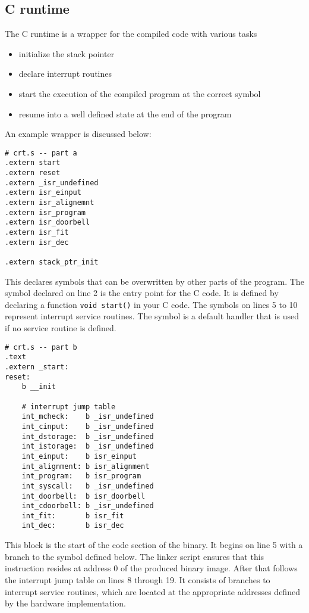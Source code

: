 \subsection{C runtime}
The C runtime is a wrapper for the compiled code with various tasks
\begin{itemize}
	\item initialize the stack pointer
	\item declare interrupt routines
	\item start the execution of the compiled program at the correct symbol
	\item resume into a well defined state at the end of the program
\end{itemize}
An example wrapper is discussed below:
\begin{lstlisting}[language=powerasm]
# crt.s -- part a
.extern start 
.extern reset
.extern _isr_undefined
.extern isr_einput
.extern isr_alignemnt
.extern isr_program
.extern isr_doorbell
.extern isr_fit
.extern isr_dec

.extern stack_ptr_init
\end{lstlisting}
This declares symbols that can be overwritten by other parts of the program.
The  symbol declared on line 2 is the entry point for the C code.
It is defined by declaring a function \texttt{void start()} in your C code.
The  symbols on lines 5 to 10 represent interrupt service routines.
The  symbol is a default handler that is used if no service routine is defined.

\begin{lstlisting}[language=powerasm]
# crt.s -- part b
.text
.extern _start:
reset:
	b __init

	# interrupt jump table
	int_mcheck:    b _isr_undefined
	int_cinput:    b _isr_undefined
	int_dstorage:  b _isr_undefined
	int_istorage:  b _isr_undefined
	int_einput:    b isr_einput
	int_alignment: b isr_alignment 
	int_program:   b isr_program
	int_syscall:   b _isr_undefined
	int_doorbell:  b isr_doorbell
	int_cdoorbell: b _isr_undefined
	int_fit:       b isr_fit
	int_dec:       b isr_dec
\end{lstlisting}
This block is the start of the code section of the binary.
It begins on line 5 with a branch to the  symbol defined below.
The linker script ensures that this instruction resides at address 0 of the produced binary image.
After that follows the interrupt jump table on lines 8 through 19.
It consists of branches to interrupt service routines, which are located at the appropriate addresses defined by the hardware implementation.


